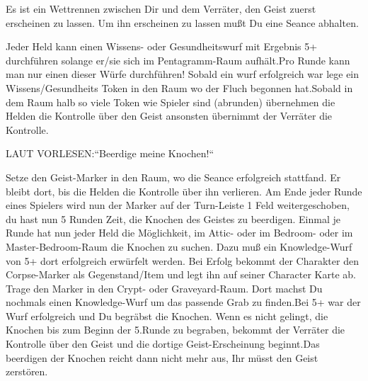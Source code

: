 





Es ist ein Wettrennen zwischen Dir und dem Verräter, den Geist zuerst erscheinen zu lassen.
Um ihn erscheinen zu lassen mußt Du eine Seance abhalten.
  \begin{itemize}
        \bitem Jeder Held kann einen Wissens- oder Gesundheitswurf mit Ergebnis 5+ durchführen solange er/sie sich im Pentagramm-Raum aufhält.Pro Runde kann man nur einen dieser Würfe durchführen!
        \bitem Sobald ein wurf erfolgreich war lege ein Wissens/Gesundheits Token in den Raum wo der Fluch begonnen hat.Sobald in dem Raum halb so viele Token wie Spieler sind (abrunden) übernehmen die Helden die Kontrolle über den Geist ansonsten übernimmt der Verräter die Kontrolle.
    \end{itemize}

LAUT VORLESEN:“Beerdige meine Knochen!“
  \begin{itemize}
        \bitem Setze den Geist-Marker in den Raum, wo die Seance erfolgreich stattfand. Er bleibt dort, bis die Helden die Kontrolle über ihn verlieren.
        \bitem Am Ende jeder Runde eines Spielers wird nun der Marker auf der Turn-Leiste 1 Feld weitergeschoben, du hast nun 5 Runden Zeit, die Knochen des Geistes zu beerdigen.
        \bitem Einmal je Runde hat nun jeder Held die Möglichkeit, im Attic- oder im Bedroom- oder im Master-Bedroom-Raum die Knochen zu suchen. Dazu muß ein Knowledge-Wurf von 5+ dort erfolgreich erwürfelt werden. Bei Erfolg bekommt der Charakter den Corpse-Marker als Gegenstand/Item und legt ihn auf seiner Character Karte ab.
        \bitem Trage den Marker in den Crypt- oder Graveyard-Raum. Dort machst Du nochmals einen Knowledge-Wurf um das passende Grab zu finden.Bei 5+ war der Wurf erfolgreich und Du begräbst die Knochen.
        \bitem Wenn es nicht gelingt, die Knochen bis zum Beginn der 5.Runde zu begraben, bekommt der Verräter die Kontrolle über den Geist und die dortige Geist-Erscheinung beginnt.Das beerdigen der Knochen reicht dann nicht mehr aus, Ihr müsst den Geist zerstören.
    \end{itemize}

